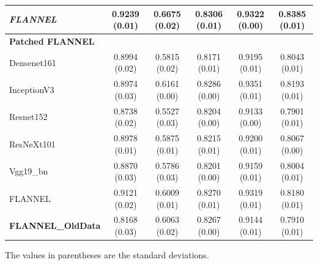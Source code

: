 \documentclass{sigkddExp}
\begin{document}
\begin{table}
\begin{tabular}{ |lccccc| }
        \textit{FLANNEL}          & 0.9239 (0.01) & 0.6675 (0.02)   & 0.8306 (0.01)      &
        0.9322 (0.00)             & 0.8385 (0.01)                                          \\ \hline
        \textbf{Patched FLANNEL}  &               &                 &                    &
                                  &                                                        \\
        Densenet161               & 0.8994 (0.02) & 0.5815 (0.02)   & 0.8171 (0.01)      &
        0.9195 (0.01)             & 0.8043 (0.01)                                          \\
        InceptionV3               & 0.8974 (0.03) & 0.6161 (0.00)   & 0.8286 (0.00)      &
        0.9351 (0.01)             & 0.8193 (0.01)                                          \\
        Resnet152                 & 0.8738 (0.02) & 0.5527 (0.03)   & 0.8204 (0.00)      &
        0.9133 (0.00)             & 0.7901 (0.01)                                          \\
        ResNeXt101                & 0.8978 (0.01) & 0.5875 (0.01)   & 0.8215 (0.01)      &
        0.9200 (0.01)             & 0.8067 (0.00)                                          \\
        Vgg19\_bn                 & 0.8870 (0.03) & 0.5786 (0.03)   & 0.8201 (0.00)      &
        0.9159 (0.01)             & 0.8004 (0.01)                                          \\

        FLANNEL                   & 0.9121 (0.02) & 0.6009 (0.01)   & 0.8270 (0.01)      &
        0.9319 (0.01)             & 0.8180 (0.01)                                          \\ \hline
        \textbf{FLANNEL\_OldData} & 0.8168 (0.03) & 0.6063 (0.02)   & 0.8267 (0.00)      &
        0.9144 (0.01)             & 0.7910 (0.01)                                          \\ \hline
    \end{tabular}\par
    \bigskip
    The values in parentheses are the standard deviations.
\end{table}
\end{document}
